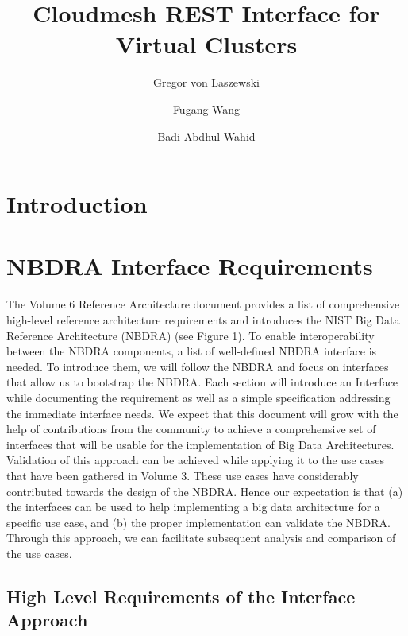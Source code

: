 \documentclass[9pt,twocolumn]{styles/osajnl}
\title{Cloudmesh REST Interface for Virtual Clusters}
\author[1,*]{Gregor von Laszewski}
\author[1]{Fugang Wang}
\author[1]{Badi Abdhul-Wahid}
\affil[1]{School of Informatics and Computing, Bloomington, IN 47408, U.S.A.}
\affil[*]{Corresponding authors: laszewski@gmal.com}
\begin{document}
\flushbottom %

\maketitle %

\tableofcontents %
\maketitle

\section{Introduction}


\section{NBDRA Interface Requirements}

The Volume 6 Reference Architecture document provides a list of comprehensive high-level reference architecture requirements and introduces the NIST Big Data Reference Architecture (NBDRA) (see Figure 1). To enable interoperability between the NBDRA components, a list of well-defined NBDRA interface is needed.  To introduce them, we will follow the NBDRA and focus on interfaces that allow us to bootstrap the NBDRA. Each section will introduce an Interface while documenting the requirement as well as a simple specification addressing the immediate interface needs. We expect that this document will grow with the help of contributions from the community to achieve a comprehensive set of interfaces that will be usable for the implementation of Big Data Architectures. Validation of this approach can be achieved while applying it to the use cases that have been gathered in Volume 3. These use cases have considerably contributed towards the design of the NBDRA. Hence our expectation is that (a) the interfaces can be used to help implementing a big data architecture for a specific use case, and (b) the proper implementation can validate the NBDRA. Through this approach, we can facilitate subsequent analysis and comparison of the use cases. 

\subsection{High Level Requirements of the Interface Approach}
\end{document}

